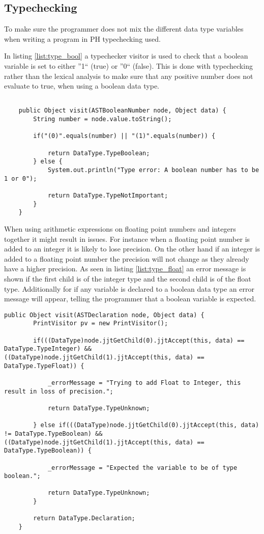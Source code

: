 \subsection{Typechecking}
To make sure the programmer does not mix the different data type variables when writing a program in PH typechecking used.

In listing \ref{list:type_bool} a typechecker visitor is used to check that a boolean variable is set to either ''1`` (true) or ''0`` (false). This is done with typechecking rather than the lexical analysis to make sure that any positive number does not evaluate to true, when using a boolean data type.
\begin{lstlisting}[Caption=Verifies/falsifies whether a boolean variable is 0 or 1, label=list:type_bool]

    public Object visit(ASTBooleanNumber node, Object data) {
    	String number = node.value.toString();

		if("(0)".equals(number) || "(1)".equals(number)) {
			
			return DataType.TypeBoolean;
		} else {
			System.out.println("Type error: A boolean number has to be 1 or 0");
			
			return DataType.TypeNotImportant;
		}	 
    }
\end{lstlisting}

When using arithmetic expressions on floating point numbers and integers together it might result in issues. For instance when a floating point number is added to an integer it is likely to lose precision. On the other hand if an integer is added to a floating point number the precision will not change as they already have a higher precision. As seen in listing \ref{list:type_float} an error message is shown if the first child is of the integer type and the second child is of the float type. Additionally for if any variable is declared to a boolean data type an error message will appear, telling the programmer that a boolean variable is expected.

\begin{lstlisting}[Caption=Checks if float is being added to an integer\, and if a non-boolean type is set to a boolean value, label=list:type_float]
	public Object visit(ASTDeclaration node, Object data) {
		PrintVisitor pv = new PrintVisitor();

		if(((DataType)node.jjtGetChild(0).jjtAccept(this, data) == DataType.TypeInteger) && ((DataType)node.jjtGetChild(1).jjtAccept(this, data) == DataType.TypeFloat)) {

			_errorMessage = "Trying to add Float to Integer, this result in loss of precision.";

			return DataType.TypeUnknown;

		} else if(((DataType)node.jjtGetChild(0).jjtAccept(this, data) != DataType.TypeBoolean) && ((DataType)node.jjtGetChild(1).jjtAccept(this, data) == DataType.TypeBoolean)) {

			_errorMessage = "Expected the variable to be of type boolean.";

			return DataType.TypeUnknown;
		}

		return DataType.Declaration;
	}
\end{lstlisting}

